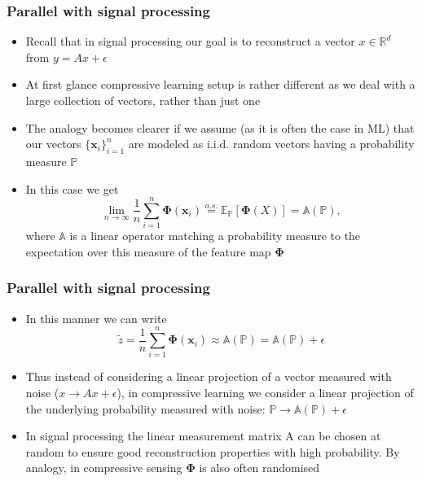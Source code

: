 
\begin{frame}
		\frametitle{Parallel with signal processing}
		
		\begin{itemize}
			\item Recall that in signal processing our goal is to reconstruct a vector $x \in \mathbb{R}^{d}$ from $y = Ax + \epsilon$
			\item At first glance compressive learning setup is rather different as we deal with a large collection of vectors, rather than just one
			\item The analogy becomes clearer if we assume (as it is often the case in ML) that our vectors {$\{\boldsymbol{x}_{i}\}_{i = 1}^{n}$} are modeled as i.i.d. random vectors having a probability measure $\mathbb{P}$
			
			\item In this case we get
			$$
			\lim _{n \rightarrow \infty} \frac{1}{n} \sum_{i=1}^{n} \boldsymbol{\Phi}\left(\boldsymbol{x}_{i}\right) \stackrel{a.s.}{=} \mathbb{E_{\mathbb{P}}}[\boldsymbol{\Phi}(X)] = \mathbb{A}(\mathbb{P}),
			$$
			where $\mathbb{A}$ is a linear operator matching a probability measure to the expectation over this measure of the feature map $\boldsymbol{\Phi}$
		\end{itemize}
	\end{frame}
	
	\begin{frame}
		\frametitle{Parallel with signal processing}
		\begin{itemize}
			\item In this manner we can write
			$$
			\tilde{z} =  \frac{1}{n} \sum_{i=1}^{n} \boldsymbol{\Phi}(\boldsymbol{x}_{i}) \approx \mathbb{A}(\mathbb{P}) = \mathbb{A}(\mathbb{P}) + \epsilon
			$$
			\item Thus instead of considering a linear projection of a vector measured with noise ($x \rightarrow Ax + \epsilon$), in compressive learning we consider a linear projection of the underlying probability measured with noise: $\mathbb{P} \rightarrow \mathbb{A}(\mathbb{P}) + \epsilon$
			
			\item In signal processing the linear measurement matrix A can be chosen at random to ensure good reconstruction properties with high probability. By analogy, in compressive sensing $\boldsymbol{\Phi}$ is also often randomised
		\end{itemize}
	\end{frame}

